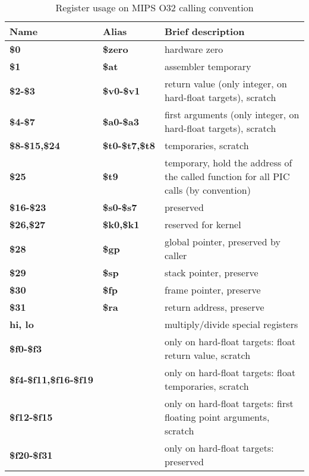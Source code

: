 \begin{table}[h]
\begin{tabular*}{0.95\textwidth}{lll}
Name                         & Alias                & Brief description\\
\hline                                                             
{\bf \$0}                    & {\bf \$zero}         & hardware zero \\
{\bf \$1}                    & {\bf \$at}           & assembler temporary \\
{\bf \$2-\$3}                & {\bf \$v0-\$v1}      & return value (only integer, on hard-float targets), scratch \\
{\bf \$4-\$7}                & {\bf \$a0-\$a3}      & first arguments (only integer, on hard-float targets), scratch\\
{\bf \$8-\$15,\$24}          & {\bf \$t0-\$t7,\$t8} & temporaries, scratch \\
{\bf \$25}                   & {\bf \$t9}           & temporary, hold the address of the called function for all PIC calls (by convention) \\
{\bf \$16-\$23}              & {\bf \$s0-\$s7}      & preserved \\
{\bf \$26,\$27}              & {\bf \$k0,\$k1}      & reserved for kernel \\
{\bf \$28}                   & {\bf \$gp}           & global pointer, preserved by caller \\
{\bf \$29}                   & {\bf \$sp}           & stack pointer, preserve \\
{\bf \$30}                   & {\bf \$fp}           & frame pointer, preserve \\
{\bf \$31}                   & {\bf \$ra}           & return address, preserve \\
{\bf hi, lo}                 &                      & multiply/divide special registers \\
{\bf \$f0-\$f3}              &                      & only on hard-float targets: float return value, scratch \\
{\bf \$f4-\$f11,\$f16-\$f19} &                      & only on hard-float targets: float temporaries, scratch \\
{\bf \$f12-\$f15}            &                      & only on hard-float targets: first floating point arguments, scratch \\
{\bf \$f20-\$f31}            &                      & only on hard-float targets: preserved \\
\end{tabular*}
\caption{Register usage on MIPS O32 calling convention}
\end{table}


